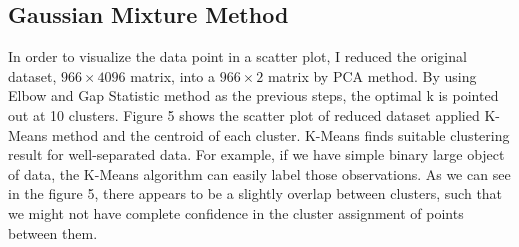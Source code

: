 \documentclass[12pt]{article}
\begin{document}
\subsection{Gaussian Mixture Method}
In order to visualize the data point in a scatter plot, I reduced the original dataset, $966\times4096$ matrix, into a $966\times2$ matrix by PCA method. By using Elbow and Gap Statistic method as the previous steps, the optimal k is pointed out at 10 clusters. Figure 5 shows the scatter plot of reduced dataset applied K-Means method and the centroid of each cluster. K-Means finds suitable clustering result for well-separated data. For example, if we have simple binary large object of data, the K-Means algorithm can easily label those observations. As we can see in the figure 5, there appears to be a slightly overlap between clusters, such that we might not have complete confidence in the cluster assignment of points between them. 
\end{document}
